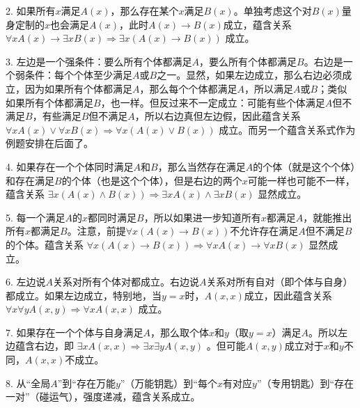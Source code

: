 2. 如果所有$x$满足$A(x)$，那么存在某个$x$满足$B(x)$。单独考虑这个对$B(x)$量身定制的$x$也会满足$A(x)$，此时$A(x)\to B(x)$成立，蕴含关系 $\forall xA(x)\to \exists xB(x)\Rightarrow \exists x(A(x)\to B(x))$ 成立。

3. 左边是一个强条件：要么所有个体都满足$A$，要么所有个体都满足$B$。右边是一个弱条件：每个个体至少满足$A$或$B$之一。显然，如果左边成立，那么右边必须成立，因为如果所有个体都满足$A$，那么每个个体都满足$A$，所以满足$A$或$B$；类似如果所有个体都满足$B$，也一样。但反过来不一定成立：可能有些个体满足$A$但不满足$B$，有些满足$B$但不满足$A$，所以右边真但左边假，因此蕴含关系 $\forall xA(x)\lor \forall xB(x)\Rightarrow \forall x(A(x)\lor B(x))$ 成立。而另一个蕴含关系式作为例题安排在后面了。

4. 如果存在一个个体同时满足$A$和$B$，那么当然存在满足$A$的个体（就是这个个体）和存在满足$B$的个体（也是这个个体），但是右边的两个$x$可能一样也可能不一样，蕴含关系 $\exists x(A(x)\land B(x))\Rightarrow \exists xA(x)\land \exists xB(x)$ 显然成立。

5. 每一个满足$A$的$x$都同时满足$B$，所以如果进一步知道所有$x$都满足$A$，就能推出所有$x$都满足$B$。注意，前提$\forall x(A(x)\to B(x))$不允许存在满足$A$但不满足$B$的个体。蕴含关系 $\forall x(A(x)\to B(x))\Rightarrow \forall xA(x)\to \forall xB(x)$ 显然成立。

6. 左边说$A$关系对所有个体对都成立。右边说$A$关系对所有自对（即个体与自身）都成立。如果左边成立，特别地，当$y=x$时，$A(x,x)$成立，因此蕴含关系 $\forall x\forall yA(x,y)\Rightarrow \forall xA(x,x)$ 成立。

7. 如果存在一个个体与自身满足$A$，那么取个体$x$和$y$（取$y=x$）满足$A$。所以左边蕴含右边，即 $\exists xA(x,x)\Rightarrow \exists x\exists yA(x,y)$ 。但可能$A(x,y)$成立对于$x$和$y$不同，$A(x,x)$不成立。

8. 从“全局$A$”到“存在万能$y$”（万能钥匙）到“每个$x$有对应$y$”（专用钥匙）到“存在一对”（碰运气），强度递减，蕴含关系成立。

